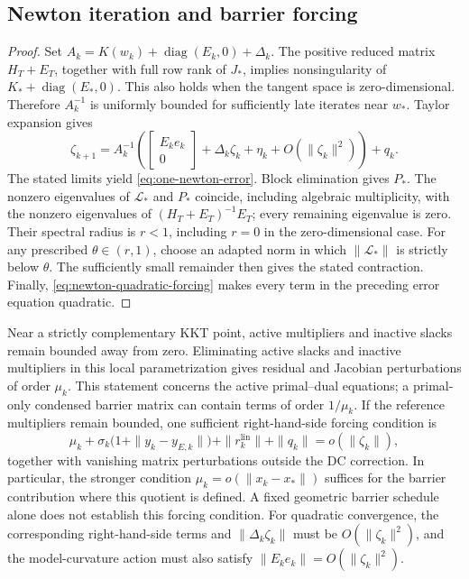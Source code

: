 \documentclass[pdflatex,sn-mathphys-num]{sn-jnl}
\theoremstyle{thmstyleone}
\theoremstyle{thmstylethree}
\begin{document}
\subsection{Newton iteration and barrier forcing}

\begin{proof}
Set $A_k=K(w_k)+\operatorname{diag}(E_k,0)+\Delta_k$.
The positive reduced matrix $H_T+E_T$, together with full row
rank of $J_*$, implies nonsingularity of
$K_*+\operatorname{diag}(E_*,0)$. This also holds when the tangent
space is zero-dimensional. Therefore $A_k^{-1}$ is uniformly bounded
for sufficiently late iterates near $w_*$. Taylor expansion gives
\[
 \zeta_{k+1}=A_k^{-1}
 \left(\begin{bmatrix}E_ke_k\\0\end{bmatrix}
       +\Delta_k\zeta_k+\eta_k+O(\|\zeta_k\|^2)\right)+q_k.
\]
The stated limits yield \eqref{eq:one-newton-error}.
Block elimination gives $P_*$. The nonzero eigenvalues of
$\mathcal L_*$ and $P_*$ coincide, including algebraic multiplicity,
with the nonzero eigenvalues of $(H_T+E_T)^{-1}E_T$;
every remaining eigenvalue is zero. Their spectral radius is
$r<1$, including $r=0$ in the zero-dimensional case.
For any prescribed $\theta\in(r,1)$, choose an adapted norm in
which $\|\mathcal L_*\|$ is strictly below $\theta$.
The sufficiently small remainder then gives the stated contraction.
Finally, \eqref{eq:newton-quadratic-forcing} makes every term in
the preceding error equation quadratic.
\end{proof}

Near a strictly complementary KKT point, active multipliers and inactive
slacks remain bounded away from zero. Eliminating active slacks and
inactive multipliers in this local parametrization gives residual and
Jacobian perturbations of order $\mu_k$. This statement concerns the
active primal--dual equations; a primal-only condensed barrier matrix
can contain terms of order $1/\mu_k$.
If the reference multipliers remain bounded, one sufficient
right-hand-side forcing condition is
\begin{equation}\label{eq:barrier-forcing-condition}
 \mu_k+\sigma_k\bigl(1+\|y_k-y_{E,k}\|\bigr)
       +\|r_k^{\mathrm{lin}}\|+\|q_k\|
       =o(\|\zeta_k\|),
\end{equation}
together with vanishing matrix perturbations outside the DC correction.
In particular, the stronger condition
$\mu_k=o(\|x_k-x_*\|)$ suffices for the barrier contribution
where this quotient is defined. A fixed geometric barrier schedule
alone does not establish this forcing condition.
For quadratic convergence, the corresponding right-hand-side terms
and $\|\Delta_k\zeta_k\|$ must be $O(\|\zeta_k\|^2)$, and the
model-curvature action must also satisfy
$\|E_ke_k\|=O(\|\zeta_k\|^2)$.
\end{document}
